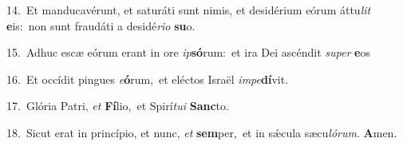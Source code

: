 {\numbfont\textcolor{\numbcolor}{14.}}~Et manducavérunt, et saturáti sunt nimis, et desidérium eórum áttu\textit{lit} \textbf{e}\-is:~\star non sunt fraudáti a desidé\-\textit{ri}\-\textit{o} \textbf{su}\-o.\par
{\numbfont\textcolor{\numbcolor}{15.}}~Adhuc escæ eórum erant in ore \textit{ip}\-\textbf{só}rum:~\star et ira Dei ascéndit \textit{su}\-\textit{per} \textbf{e}\-os\par
{\numbfont\textcolor{\numbcolor}{16.}}~Et occídit pingues \textit{e}\-\textbf{ó}rum,~\star et eléctos Israël \textit{im}\-\textit{pe}\textbf{dí}vit.\par
{\numbfont\textcolor{\numbcolor}{17.}}~Glória Patri, \textit{et} \textbf{Fí}\-lio,~\star et Spirí\-\textit{tu}\-\textit{i} \textbf{Sanc}\-to.\par
{\numbfont\textcolor{\numbcolor}{18.}}~Sicut erat in princípio, et nunc, \textit{et} \textbf{sem}\-per,~\star et in sǽcula sæcu\-\textit{ló}\-\textit{rum}. \textbf{A}\-men.\par
